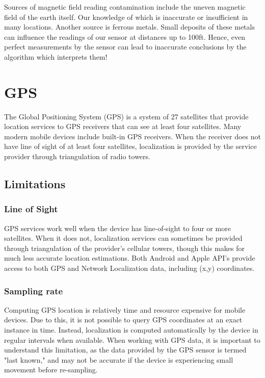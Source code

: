 \documentclass{acm_proc_article-sp}
\begin{document}
Sources of magnetic field reading contamination include the uneven magnetic field of the earth itself.  Our knowledge of which is inaccurate or insufficient in many locations.  Another source is ferrous metals.  Small deposits of these metals can influence the readings of our sensor at distances up to 100ft. \cite{psiaki1990three} Hence, even perfect measurements
by the sensor can lead to inaccurate conclusions by the algorithm which interprets them!\cite{psiaki1990three,roetenberg2005compensation}

\section{GPS}

The Global Positioning System (GPS) is a system of 27 satellites that provide location services to GPS receivers
that can see at least four satellites.  Many modern mobile devices include built-in GPS receivers.  When the receiver does not
have line of sight of at least four satellites, localization is provided by the service provider through triangulation of radio towers. 

\subsection{Limitations}
\subsubsection{Line of Sight}
GPS services work well when the device has line-of-sight to four or more satellites.  When it does not, localization services can sometimes be
provided through triangulation of the provider's cellular towers, though this makes for much less accurate location estimations.  Both Android and Apple API's provide access to both GPS and Network Localization
data, including (x,y) coordinates.\cite{krasner2003methods}

\subsubsection{Sampling rate}
Computing GPS location is relatively time and resource expensive for mobile devices.  Due to this, it is not possible to query
GPS coordinates at an exact instance in time.  Instead, localization is computed automatically by the device in regular intervals when available.
When working with GPS data, it is important to understand this limitation, as the data provided by the GPS sensor is termed "last known," and may not be accurate if the device is experiencing small movement before re-sampling. \cite{sencam}
\end{document}

